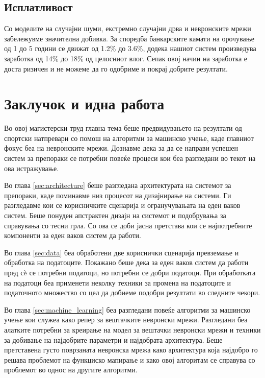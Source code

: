 \section{Исплатливост}

Со моделите на случајни шуми, екстремно случајни дрва и невронските мрежи забележувме значителна добивка. За споредба банкарските камати на орочување од 1 до 5 години се движат од 1.2\% до 3.6\%, додека нашиот систем произведува заработка од 14\% до 18\% од целосниот влог. Сепак овој начин на заработка е доста ризичен и не можеме да го одобриме и покрај добрите резултати.

\chapter{Заклучок и идна работа}
\label{sec:conclusion}

Во овој магистерски труд главна тема беше предвидувањето на резултати од спортски натпревари со помош на алгоритми за машинско учење, каде главниот фокус беа на невронските мрежи. Дознавме дека за да се направи успешен систем за препораки се потребни повеќе процеси кои беа разгледани во текот на ова истражување.

Во глава \ref{sec:architecture} беше разгледана архитектурата на системот за препораки, каде поминавме низ процесот на дизајнирање на системи. Ги разгледавме кои се корисничките сценарија и огранучувањата на еден ваков систем. Беше понуден апстрактен дизајн на системот и подобрувања за справувања со тесни грла. Со ова се доби јасна претстава кои се најпотребните компоненти за еден ваков систем да работи.

Во глава \ref{sec:data} беа обработени две кориснички сценарија превземање и обработка на податоците. Покажано беше дека за еден ваков систем да работи пред сè се потребни податоци, но потребни се добри податоци. При обработката на податоци беа применети неколку техники за промена на податоците и податочното множество со цел да добиеме подобри резултати во следните чекори.

Во глава \ref{sec:machine_learning} беа разгледани повеќе алгоритми за машинско учење кои служеа како репер за вештачките невронски мрежи. Разгледани беа алатките потребни за креирање на модел за вештачки невронски мрежи и техники за добивање на најдобрите параметри и најдобрата архитектура. Беше претставена густо поврзаната невронска мрежа како архитектура која најдобро го решава проблемот на функциско мапирање и како овој алгоритам се справува со проблемот во однос на другите алгоритми.

